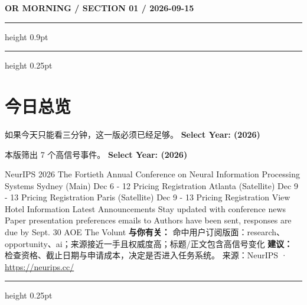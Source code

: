 \documentclass[10.5pt]{ctexart}
\begin{document}
{\small\bfseries OR MORNING / SECTION 01 / 2026-09-15}
\vspace{2mm}
\hrule height 0.9pt
\vspace{1.5mm}
\hrule height 0.25pt
\vspace{4mm}
\section*{今日总览}
{\color{ormuted} 如果今天只能看三分钟，这一版必须已经足够。}
\vspace{2mm}
{\fontsize{25}{29}\selectfont\bfseries Select Year: (2026)}\par
\vspace{2mm}
{\large 本版筛出 7 个高信号事件。}
\vspace{3mm}
{\Large\bfseries Select Year: (2026)}\par
NeurIPS 2026 The Fortieth Annual Conference on Neural Information Processing Systems Sydney (Main) Dec 6 - 12 Pricing Registration Atlanta (Satellite) Dec 9 - 13 Pricing Registration Paris (Satellite) Dec 9 - 13 Pricing Registration View Hotel Information Latest Announcements Stay updated with conference news Paper presentation preferences emails to Authors have been sent, responses are due by Sept. 30 AOE The Volunt
\textbf{与你有关：} 命中用户订阅版面：research、opportunity、ai；来源接近一手且权威度高；标题/正文包含高信号变化
\textbf{建议：} 检查资格、截止日期与申请成本，决定是否进入任务系统。
{\footnotesize\color{ormuted} 来源：NeurIPS · \url{https://neurips.cc/}}
\vspace{3mm}
\hrule height 0.25pt
\vspace{3mm}
\end{document}
